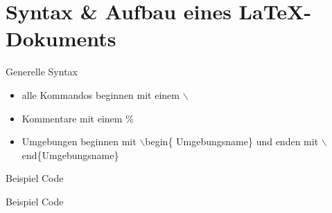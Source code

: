 \section{Syntax \& Aufbau eines \LaTeX -Dokuments}

\begin{frame}{Generelle Syntax}
	\begin{itemize}[<+->]
		\item alle Kommandos beginnen mit einem $\backslash$
		\item Kommentare mit einem \%
		\item Umgebungen beginnen mit $\backslash$begin\{ Umgebungsname\} und enden mit $\backslash$end\{Umgebungsname\}
	\end{itemize}
\end{frame}

\begin{frame}[fragile]{Beispiel Code}
	\begin{Code}
	\centering
		\begin{minipage}{0.9\textwidth}
	
		
	
		\end{minipage}
	\end{Code}

\end{frame}
\begin{frame}[fragile]{Beispiel Code}
	\lstsettex
	\begin{Code}
	\centering
		\begin{minipage}{0.9\textwidth}
		
		\end{minipage}
	\end{Code}

\end{frame}

